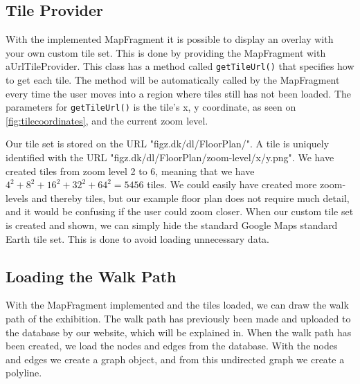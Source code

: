 \subsection*{Tile Provider}
With the implemented MapFragment it is possible to display an overlay with your own custom tile set. This is done by providing the MapFragment with a\linebreak UrlTileProvider\citep{tilecoordinates}. This class has a method called \lstinline|getTileUrl()| that specifies how to get each tile. The method will be automatically called by the MapFragment every time the user moves into a region where tiles still has not been loaded. The parameters for \lstinline|getTileUrl()| is the tile's x, y coordinate, as seen on \autoref{fig:tilecoordinates}, and the current zoom level.

Our tile set is stored on the URL "figz.dk/dl/FloorPlan/". A tile is uniquely identified with the URL "figz.dk/dl/FloorPlan/zoom-level/x/y.png". We have created tiles from zoom level 2 to 6, meaning that we have $4^2+8^2+16^2+32^2+64^2 = 5456$ tiles. We could easily have created more zoom-levels and thereby tiles, but our example floor plan does not require much detail, and it would be confusing if the user could zoom closer. When our custom tile set is created and shown, we can simply hide the standard Google Maps standard Earth tile set. This is done to avoid loading unnecessary data.

\subsection*{Loading the Walk Path}
With the MapFragment implemented and the tiles loaded, we can draw the walk path of the exhibition. The walk path has previously been made and uploaded to the database by our website, which will be explained in. When the walk path has been created, we load the nodes and edges from the database. With the nodes and edges we create a graph object, and from this undirected graph we create a polyline.


